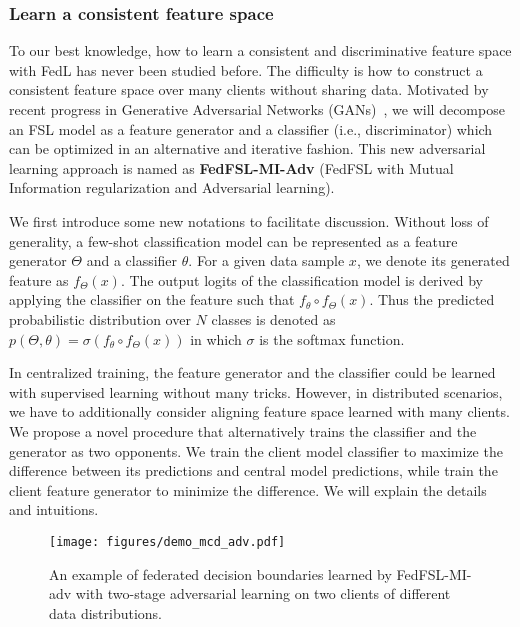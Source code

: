 \subsubsection{Learn a consistent feature space}
To our best knowledge, how to learn a consistent and discriminative feature space with FedL has never been studied before.
The difficulty is how to construct a consistent feature space over many clients without sharing data.
Motivated by recent progress in Generative Adversarial Networks (GANs)~\cite{goodfellow2014generative, saito2018mcd}, we will decompose an FSL model as a feature generator and a classifier (i.e., discriminator) which can be optimized in an alternative and iterative fashion.
This new adversarial learning approach is named as \textbf{FedFSL-MI-Adv} (FedFSL with Mutual Information regularization and Adversarial learning).


We first introduce some new notations to facilitate discussion.
Without loss of generality, a few-shot classification model can be represented as a feature generator $\Theta$ and a classifier $\theta$. For a given data sample $x$, we denote its generated feature as $f_{\Theta}(x)$. The output logits of the classification model is derived by applying the classifier on the feature such that $f_{\theta}\circ f_{\Theta}(x)$. Thus the predicted  probabilistic distribution over $N$ classes is denoted as
$p(\Theta, \theta)=\sigma (f_{\theta}\circ f_{\Theta}(x))$ in which $\sigma$ is the softmax function.  

In centralized training, the
feature generator and the classifier could be learned with supervised learning without many tricks. However, in distributed scenarios, we have to additionally consider aligning feature space learned with many clients. We propose a novel procedure that
alternatively trains the classifier and the generator as two opponents. We train the client model classifier to maximize the difference between its predictions and central model predictions, while train the client feature generator to minimize the difference. We will explain the details and intuitions.



\begin{figure}
\begin{center}
\texttt{[image: figures/demo\_mcd\_adv.pdf]}
\end{center}
\vspace{-5pt}
\caption{An example of federated decision boundaries learned by FedFSL-MI-adv with two-stage adversarial learning on two clients of different data distributions. }
\label{fig:demo_mcd_adv}
\vspace{-15pt}
\end{figure} 


